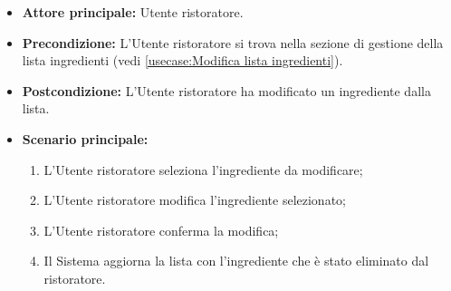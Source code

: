 \label{usecase:Modifica ingrediente}
\begin{itemize}

	\item \textbf{Attore principale:} Utente ristoratore.

	\item \textbf{Precondizione:} L'Utente ristoratore si trova nella sezione di gestione della lista ingredienti (vedi \autoref{usecase:Modifica lista ingredienti}).

	\item \textbf{Postcondizione:} L'Utente ristoratore ha modificato un ingrediente dalla lista.

	\item \textbf{Scenario principale:}
	\begin{enumerate}
		\item L'Utente ristoratore seleziona l'ingrediente da modificare;
		\item L'Utente ristoratore modifica l'ingrediente selezionato;
		\item L'Utente ristoratore conferma la modifica;
		\item Il Sistema aggiorna la lista con l'ingrediente che è stato eliminato dal ristoratore.
	\end{enumerate}
\end{itemize}
